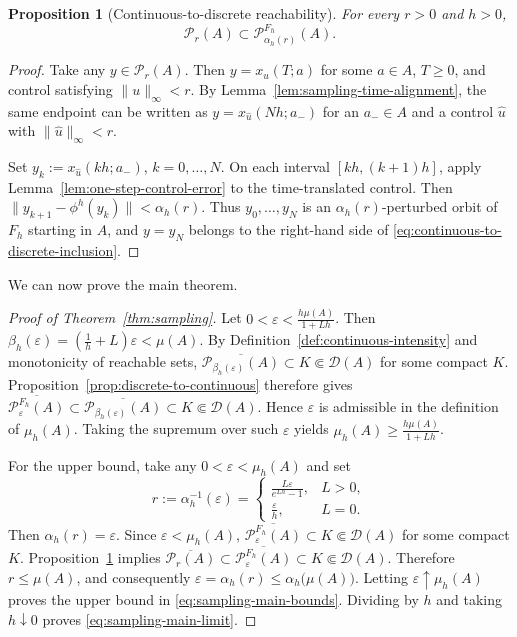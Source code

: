 \documentclass[pdflatex,sn-mathphys-num]{sn-jnl}
\numberwithin{equation}{section}
\theoremstyle{thmstyleone}%
\newtheorem{proposition}[theorem]{Proposition}
\theoremstyle{definition}
\theoremstyle{remark}
\begin{document}
\begin{proposition}[Continuous-to-discrete reachability]
\label{prop:continuous-to-discrete}
For every $r>0$ and $h>0$,
\begin{equation}
\label{eq:continuous-to-discrete-inclusion}
    \mathcal P_r(A)
    \subset
    \mathcal P_{\alpha_h(r)}^{F_h}(A).
\end{equation}
\end{proposition}

\begin{proof}
Take any $y\in\mathcal P_r(A)$. Then $y=x_u(T;a)$ for some $a\in A$, $T\geq0$, and control satisfying
$\|u\|_\infty<r$. By Lemma~\ref{lem:sampling-time-alignment}, the same endpoint can be written as $y=x_{\widehat u}(Nh;a_-)$ for an $a_-\in A$ and a control $\widehat u$ with $\|\widehat u\|_\infty<r$.

Set $y_k:=x_{\widehat u}(kh;a_-)$, $k=0,\ldots,N$. On each interval $[kh,(k+1)h]$, apply Lemma~\ref{lem:one-step-control-error} to the time-translated control. Then $\|y_{k+1}-\phi^h(y_k)\| < \alpha_h(r)$. Thus $y_0,\ldots,y_N$ is an $\alpha_h(r)$-perturbed orbit of $F_h$ starting in $A$, and $y=y_N$ belongs to the right-hand side of \eqref{eq:continuous-to-discrete-inclusion}.
\end{proof}

We can now prove the main theorem.

\begin{proof}[Proof of Theorem~\ref{thm:sampling}]
Let
    $0<\varepsilon<
    \frac{h\mu(A)}{1+Lh}$.
Then
    $\beta_h(\varepsilon)
    =
    \left(\frac1h+L\right)\varepsilon
    <
    \mu(A)$.
By Definition~\ref{def:continuous-intensity} and monotonicity of reachable sets, $\overline{\mathcal P_{\beta_h(\varepsilon)}(A)} \subset K\Subset\mathcal D(A)$ for some compact $K$. Proposition~\ref{prop:discrete-to-continuous} therefore gives $\overline{\mathcal P_\varepsilon^{F_h}(A)}
    \subset
    \overline{\mathcal P_{\beta_h(\varepsilon)}(A)}
    \subset K\Subset\mathcal D(A)$.
Hence $\varepsilon$ is admissible in the definition of $\mu_h(A)$. Taking the supremum over such $\varepsilon$ yields $\mu_h(A)
    \geq
    \frac{h\mu(A)}{1+Lh}$.

For the upper bound, take any $0<\varepsilon<\mu_h(A)$ and set
\[
    r:=\alpha_h^{-1}(\varepsilon)
    =
    \begin{cases}
    \displaystyle
    \frac{L\varepsilon}{e^{Lh}-1},&L>0,\\[2ex]
    \displaystyle
    \frac{\varepsilon}{h},&L=0.
    \end{cases}
\]
Then $\alpha_h(r)=\varepsilon$. Since $\varepsilon<\mu_h(A)$,
    $\overline{\mathcal P_\varepsilon^{F_h}(A)}
    \subset K\Subset\mathcal D(A)$
for some compact $K$. Proposition~\ref{prop:continuous-to-discrete} implies
    $\overline{\mathcal P_r(A)}
    \subset
    \overline{\mathcal P_\varepsilon^{F_h}(A)}
    \subset K\Subset\mathcal D(A)$.
Therefore $r\leq\mu(A)$, and consequently
    $\varepsilon=\alpha_h(r)
    \leq
    \alpha_h\bigl(\mu(A)\bigr)$.
Letting $\varepsilon\uparrow\mu_h(A)$ proves the upper bound in \eqref{eq:sampling-main-bounds}. Dividing by $h$ and taking $h\downarrow0$ proves \eqref{eq:sampling-main-limit}.
\end{proof}
\end{document}
